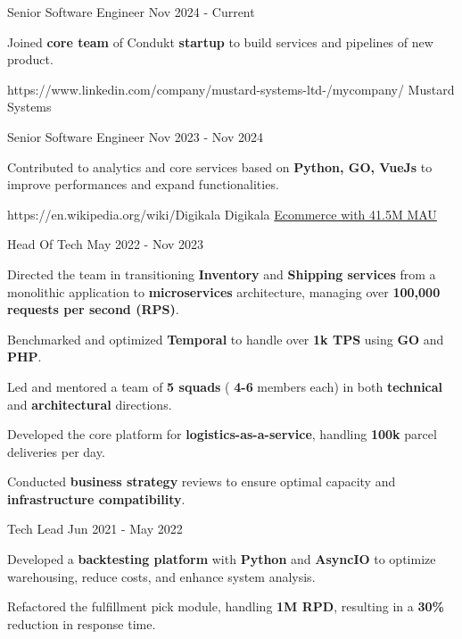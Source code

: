 \documentclass[
	10pt, %
]{FreemanCV}
\begin{document}
\begin{paracol}{2}
\position
{Senior Software Engineer}
{Nov 2024 - Current}
{
	
	\item Joined \textbf{core team} of Condukt \textbf{startup} to build services and pipelines of new product.
}


\company
{https://www.linkedin.com/company/mustard-systems-ltd-/mycompany/}
{Mustard Systems}
{}
{}


\position
{Senior Software Engineer}
{Nov 2023 - Nov 2024}
{

	\item Contributed to analytics and core services based on \textbf{Python, GO, VueJs} to improve performances and expand functionalities.
}
\vspace{5pt}
\company
{https://en.wikipedia.org/wiki/Digikala}
{Digikala}
{\href{https://about.digikala.com/en/reports/digikala1401/}{Ecommerce with 41.5M MAU}}

\position
{Head Of Tech}
{May 2022 - Nov 2023}
{
	
	\item Directed the team in transitioning \textbf{Inventory} and \textbf{Shipping services} from a monolithic application to \textbf{microservices} architecture, managing over \textbf{100,000 requests per second (RPS)}.
	\item Benchmarked and optimized \textbf{Temporal} to handle over \textbf{1k TPS} using \textbf{GO} and \textbf{PHP}.
	\item Led and mentored a team of \textbf{5 squads} (
	\textbf{4-6} members each) in both \textbf{technical} and \textbf{architectural} directions.
	\item Developed the core platform for \textbf{logistics-as-a-service}, handling \textbf{100k} parcel deliveries per day.
	\item Conducted \textbf{business strategy} reviews to ensure optimal capacity and \textbf{infrastructure compatibility}.

}

\position
{Tech Lead}
{Jun 2021 - May 2022}
{
\item Developed a \textbf{backtesting platform} with \textbf{Python} and \textbf{AsyncIO} to optimize warehousing, reduce costs, and enhance system analysis.
	\item Refactored the fulfillment pick module, handling \textbf{1M RPD}, resulting in a \textbf{30\%} reduction in response time.
}


\end{paracol}
\end{document}
